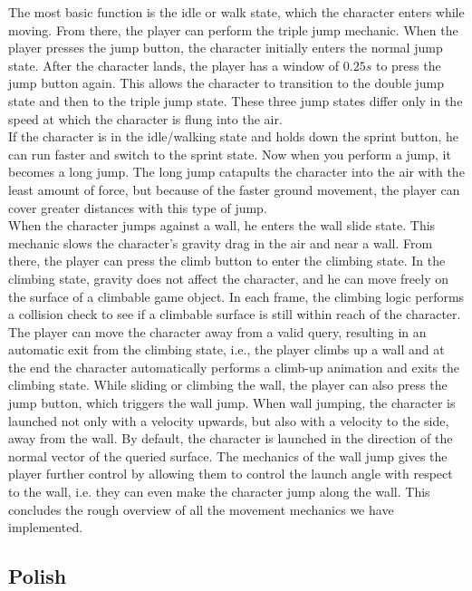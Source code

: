 \documentclass[letterpaper, 10 pt, conference]{ieeeconf}  %
\begin{document}
The most basic function is the idle or walk state, which the character enters while moving.
From there, the player can perform the triple jump mechanic.
When the player presses the jump button, the character initially enters the normal jump state. 
After the character lands, the player has a window of $\textit{0.25s}$ to press the jump button again.
This allows the character to transition to the double jump state and then to the triple jump state.
These three jump states differ only in the speed at which the character is flung into the air. \\
If the character is in the idle/walking state and holds down the sprint button, he can run faster and switch to the sprint state.
Now when you perform a jump, it becomes a long jump.
The long jump catapults the character into the air with the least amount of force, but because of the faster ground movement, the player can cover greater distances with this type of jump. \\
When the character jumps against a wall, he enters the wall slide state. 
This mechanic slows the character's gravity drag in the air and near a wall.
From there, the player can press the climb button to enter the climbing state.
In the climbing state, gravity does not affect the character, and he can move freely on the surface of a climbable game object.
In each frame, the climbing logic performs a collision check to see if a climbable surface is still within reach of the character.
The player can move the character away from a valid query, resulting in an automatic exit from the climbing state, i.e., the player climbs up a wall and at the end the character automatically performs a climb-up animation and exits the climbing state.
While sliding or climbing the wall, the player can also press the jump button, which triggers the wall jump.
When wall jumping, the character is launched not only with a velocity upwards, but also with a velocity to the side, away from the wall.
By default, the character is launched in the direction of the normal vector of the queried surface.
The mechanics of the wall jump gives the player further control by allowing them to control the launch angle with respect to the wall, i.e. they can even make the character jump along the wall.
This concludes the rough overview of all the movement mechanics we have implemented.

\subsection{Polish}
\end{document}
